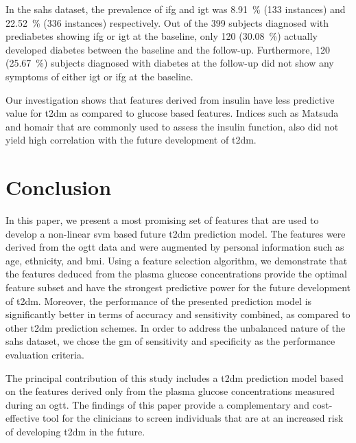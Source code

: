 \documentclass[journal,comsoc]{IEEEtran}
\renewcommand{\^}{\hat}  %
\begin{document}
In the \ac{sahs} dataset, the prevalence of \ac{ifg} and \ac{igt} was \SI{8.91}{\percent} (\num{133} instances) and \SI{22.52}{\percent} (\num{336} instances) respectively. Out of the \num{399} subjects diagnosed with prediabetes showing \ac{ifg} or \ac{igt} at the baseline, only \num{120} (\SI{30.08}{\percent}) actually developed diabetes between the baseline and the follow-up. Furthermore, \num{120} (\SI{25.67}{\percent}) subjects diagnosed with diabetes at the follow-up did not show any symptoms of either \ac{igt} or \ac{ifg} at the baseline.

Our investigation shows that features derived from insulin have less predictive value for \ac{t2dm} as compared to glucose based features. Indices such as Matsuda and \ac{homair} that are commonly used to assess the insulin function, also did not yield high correlation with the future development of \ac{t2dm}.
%
%
\section{Conclusion}
%
%
In this paper, we present a most promising set of features that are used to develop a non-linear \ac{svm} based future \ac{t2dm} prediction model. The features were derived from the \ac{ogtt} data and were augmented by personal information such as age, ethnicity, and \ac{bmi}. Using a feature selection algorithm, we demonstrate that the features deduced from the plasma glucose concentrations provide the optimal feature subset and have the strongest predictive power for the future development of \ac{t2dm}. Moreover, the performance of the presented prediction model is significantly better in terms of accuracy and sensitivity combined, as compared to other \ac{t2dm} prediction schemes. In order to address the unbalanced nature of the \ac{sahs} dataset, we chose the \ac{gm} of sensitivity and specificity as the performance evaluation criteria.

The principal contribution of this study includes a \ac{t2dm} prediction model based on the features derived only from the plasma glucose concentrations measured during an \ac{ogtt}. The findings of this paper provide a complementary and cost-effective tool for the clinicians to screen individuals that are at an increased risk of developing \ac{t2dm} in the future.
%
%
%
%
\end{document}
